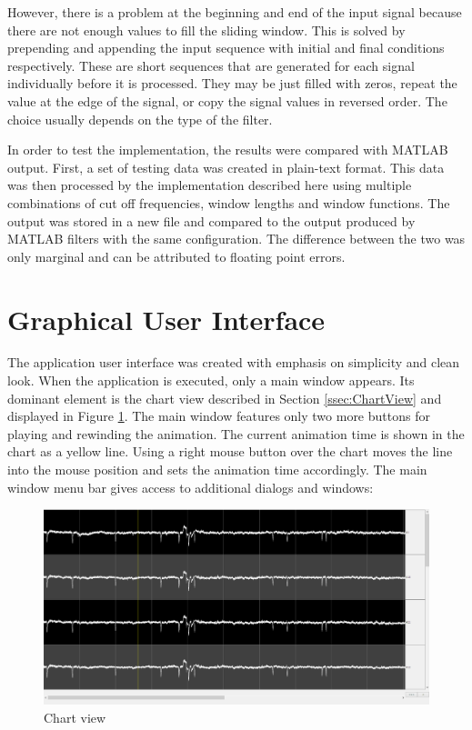 However, there is a problem at the beginning and end of the input signal because there are not enough values to fill the sliding window. This is solved by prepending and appending the input sequence with initial and final conditions respectively. These are short sequences that are generated for each signal individually before it is processed. They may be just filled with zeros, repeat the value at the edge of the signal, or copy the signal values in reversed order. The choice usually depends on the type of the filter.

In order to test the implementation, the results were compared with MATLAB output. First, a set of testing data was created in plain-text format. This data was then processed by the implementation described here using multiple combinations of cut off frequencies, window lengths and window functions. The output was stored in a new file and compared to the output produced by MATLAB filters with the same configuration. The difference between the two was only marginal and can be attributed to floating point errors.

\section{Graphical User Interface}
\label{sec:GUI}
The application user interface was created with emphasis on simplicity and clean look. When the application is executed, only a main window appears. Its dominant element is the chart view described in Section \ref{ssec:ChartView} and displayed in Figure \ref{fig:chartView}. The main window features only two more buttons for playing and rewinding the animation. The current animation time is shown in the chart as a yellow line. Using a right mouse button over the chart moves the line into the mouse position and sets the animation time accordingly. The main window menu bar gives access to additional dialogs and windows:

\begin{figure}[htb]
	\centering
	\includegraphics[width=1\linewidth]{fig/chartView.png}
	\caption{Chart view}
	\label{fig:chartView}
\end{figure}

